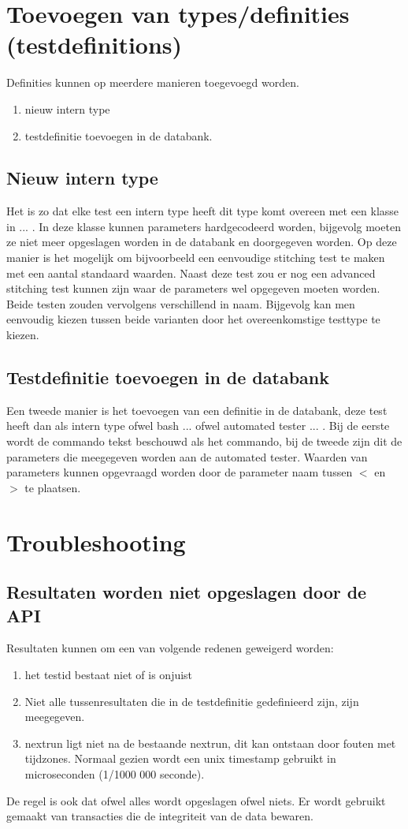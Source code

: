 \section{Toevoegen van types/definities (testdefinitions)}
\npar
Definities kunnen op meerdere manieren toegevoegd worden.
\begin{enumerate}
\item nieuw intern type
\item testdefinitie toevoegen in de databank.
\end{enumerate}

\subsection{Nieuw intern type}
Het is zo dat elke test een intern type heeft dit type komt overeen met een klasse in ... . In deze klasse kunnen parameters hardgecodeerd worden, bijgevolg moeten ze niet meer opgeslagen worden in de databank en doorgegeven worden. Op deze manier is het mogelijk om bijvoorbeeld een eenvoudige stitching test te maken met een aantal standaard waarden. Naast deze test zou er nog een advanced stitching test kunnen zijn waar de parameters wel opgegeven moeten worden. Beide testen zouden vervolgens verschillend in naam. Bijgevolg kan men eenvoudig kiezen tussen beide varianten door het overeenkomstige testtype te kiezen.

\subsection{Testdefinitie toevoegen in de databank}
\npar
Een tweede manier is het toevoegen van een definitie in de databank, deze test heeft dan als intern type ofwel bash ... ofwel automated tester ... . Bij de eerste wordt de commando tekst beschouwd als het commando, bij de tweede zijn dit de parameters die meegegeven worden aan de automated tester. Waarden van parameters kunnen opgevraagd worden door de parameter naam tussen $<$ en $>$ te plaatsen.

\section{Troubleshooting}
\subsection{Resultaten worden niet opgeslagen door de API}
\npar
Resultaten kunnen om een van volgende redenen geweigerd worden:
\begin{enumerate}
\item het testid bestaat niet of is onjuist
\item Niet alle tussenresultaten die in de testdefinitie gedefinieerd zijn, zijn meegegeven. 
\item nextrun ligt niet na de bestaande nextrun, dit kan ontstaan door fouten met tijdzones. Normaal gezien wordt een unix timestamp gebruikt in microseconden (1/1000 000 seconde).
\end{enumerate}
De regel is ook dat ofwel alles wordt opgeslagen ofwel niets. Er wordt gebruikt gemaakt van transacties die de integriteit van de data bewaren.
